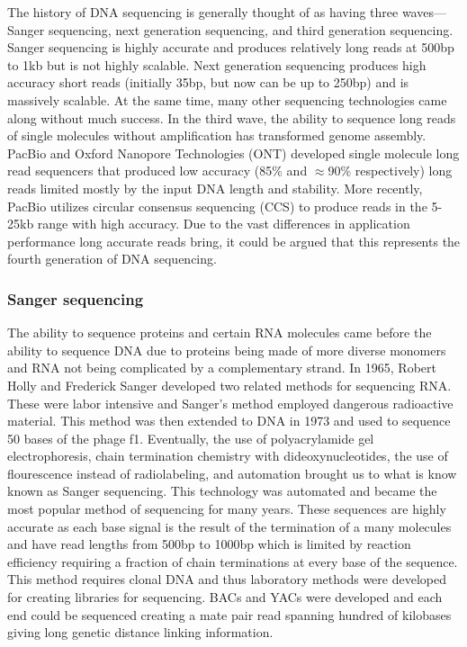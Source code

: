 \par{
The history of DNA sequencing is generally thought of as having three waves---Sanger sequencing, next generation sequencing, and third generation sequencing. Sanger sequencing is highly accurate and produces relatively long reads at 500bp to 1kb but is not highly scalable. Next generation sequencing produces high accuracy short reads (initially 35bp, but now can be up to 250bp) and is massively scalable. At the same time, many other sequencing technologies came along without much success. In the third wave, the ability to sequence long reads of single molecules without amplification has transformed genome assembly. PacBio and Oxford Nanopore Technologies (ONT) developed single molecule long read sequencers that produced low accuracy (85\% and $\approx$90\% respectively) long reads limited mostly by the input DNA length and stability. More recently, PacBio utilizes circular consensus sequencing (CCS) to produce reads in the 5-25kb range with high accuracy. Due to the vast differences in application performance long accurate reads bring, it could be argued that this represents the fourth generation of DNA sequencing.
}

\subsubsection{Sanger sequencing}\label{section:sanger}

\par{
The ability to sequence proteins and certain RNA molecules came before the ability to sequence DNA due to proteins being made of more diverse monomers and RNA not being complicated by a complementary strand\cite{aminoacidsequence}\cite{sequenceofsequencers}. In 1965, Robert Holly and Frederick Sanger developed two related methods for sequencing RNA\cite{Holly1}\cite{Sanger1}. These were labor intensive and Sanger's method employed dangerous radioactive material. This method was then extended to DNA in 1973 and used to sequence 50 bases of the phage f1\cite{Sanger2}. Eventually, the use of polyacrylamide gel electrophoresis, chain termination chemistry with dideoxynucleotides, the use of flourescence instead of radiolabeling, and automation brought us to what is know known as Sanger sequencing\cite{Sanger3}. This technology was automated and became the most popular method of sequencing for many years\cite{Hunkapiller1991}. These sequences are highly accurate as each base signal is the result of the termination of a many molecules and have read lengths from 500bp to 1000bp which is limited by reaction efficiency requiring a fraction of chain terminations at every base of the sequence. This method requires clonal DNA and thus laboratory methods were developed for creating libraries for sequencing. BACs and YACs \cite{BACsYACs} were developed and each end could be sequenced creating a mate pair read spanning hundred of kilobases giving long genetic distance linking information.
}

